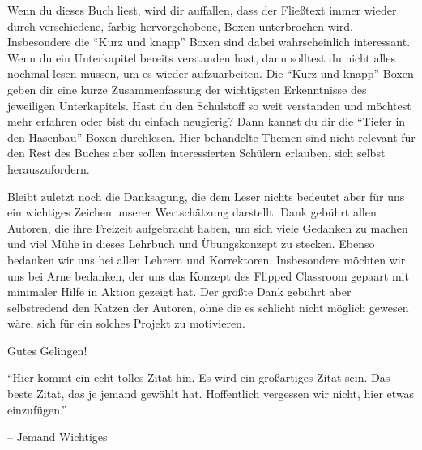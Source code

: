 \documentclass[../main.tex]{subfiles}
\begin{document}
Wenn du dieses Buch liest, wird dir auffallen, dass der Fließtext immer wieder durch verschiedene, farbig hervorgehobene, Boxen unterbrochen wird. Insbesondere die \enquote{Kurz und knapp} Boxen sind dabei wahrscheinlich interessant. Wenn du ein Unterkapitel bereits verstanden hast, dann solltest du nicht alles nochmal lesen müssen, um es wieder aufzuarbeiten. Die \enquote{Kurz und knapp} Boxen geben dir eine kurze Zusammenfassung der wichtigsten Erkenntnisse des jeweiligen Unterkapitels. Hast du den Schulstoff so weit verstanden und möchtest mehr erfahren oder bist du einfach neugierig? Dann kannst du dir die \enquote{Tiefer in den Hasenbau} Boxen durchlesen. Hier behandelte Themen sind nicht relevant für den Rest des Buches aber sollen interessierten Schülern erlauben, sich selbst herauszufordern.

Bleibt zuletzt noch die Danksagung, die dem Leser nichts bedeutet aber für uns ein wichtiges Zeichen unserer Wertschätzung darstellt.
Dank gebührt allen Autoren, die ihre Freizeit aufgebracht haben, um sich viele Gedanken zu machen und viel Mühe in dieses Lehrbuch und Übungskonzept zu stecken. Ebenso bedanken wir uns bei allen Lehrern und Korrektoren. Insbesondere möchten wir uns bei Arne bedanken, der uns das Konzept des Flipped Classroom gepaart mit minimaler Hilfe in Aktion gezeigt hat. Der größte Dank gebührt aber selbstredend den Katzen der Autoren, ohne die es schlicht nicht möglich gewesen wäre, sich für ein solches Projekt zu motivieren.

{\hfill \Large Gutes Gelingen!}

\bigskip
\epigraph{\enquote{Hier kommt ein echt tolles Zitat hin. Es wird ein großartiges Zitat sein. Das beste Zitat, das je jemand gewählt hat. Hoffentlich vergessen wir nicht, hier etwas einzufügen.}}{-- Jemand Wichtiges}
\end{document}

